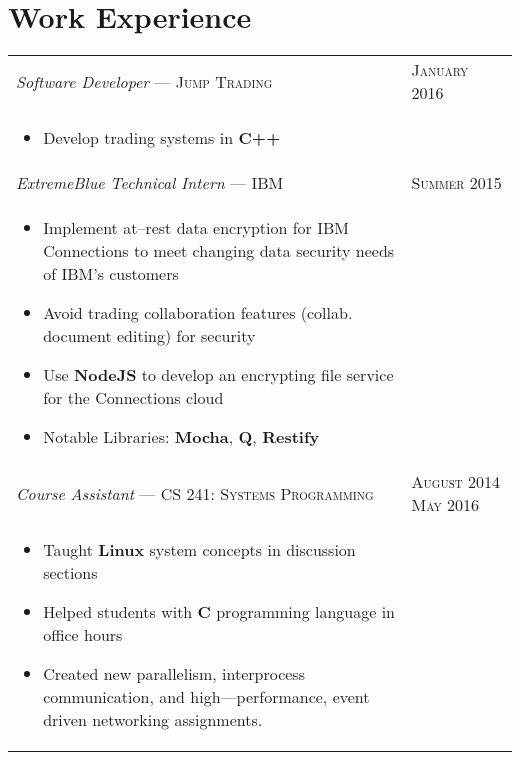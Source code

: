 \documentclass[letterpaper,10pt]{article}
\begin{document}
\section{Work Experience}
\begin{tabular}{p{13.5cm}>{\raggedleft\arraybackslash}p{2.5cm}}

    \emph{Software Developer} --- \textsc{Jump Trading} & \textsc{January 2016} \\
    \vspace{-2mm}
    \begin{itemize}
        \item Develop trading systems in \textbf{C++}
    \end{itemize} \\

    \emph{ExtremeBlue Technical Intern} --- \textsc{IBM} & \textsc{Summer 2015} \\

    \vspace{-2mm}
    \begin{itemize}
        \item Implement at--rest data encryption for IBM Connections to meet changing data security needs of IBM's customers
        \item Avoid trading collaboration features (collab. document editing) for security
        \item Use \textbf{NodeJS} to develop an encrypting file service for the Connections cloud
        \item Notable Libraries: \textbf{Mocha}, \textbf{Q}, \textbf{Restify}
    \end{itemize} \\

    \emph{Course Assistant} --- \textsc{CS 241: Systems Programming} &
    \textsc{August 2014 May 2016} \\

    \vspace{-6mm}
    \begin{itemize}
        \item Taught \textbf{Linux} system concepts in discussion sections
        \item Helped students with \textbf{C} programming language in office hours
        \item Created new parallelism, interprocess communication, and high---performance, event driven networking assignments.
    \end{itemize} \\


\end{tabular}
\end{document}
